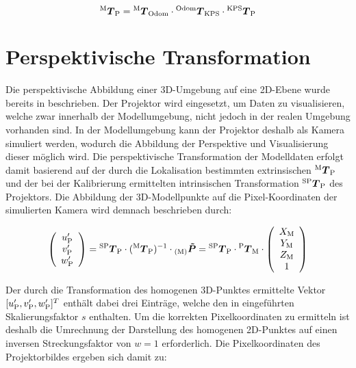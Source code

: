 \begin{equation}
{^{\mathrm{M}}\mbox{\boldmath{$T$}}_{\mathrm{P}}} = {^{\mathrm{M}}\mbox{\boldmath{$T$}}_{\mathrm{Odom}}} \cdot {^{\mathrm{Odom}}\mbox{\boldmath{$T$}}_{\mathrm{KPS}}} \cdot {^{\mathrm{KPS}}\mbox{\boldmath{$T$}}_{\mathrm{P}}}
\end{equation}

\section{Perspektivische Transformation}
Die perspektivische Abbildung einer 3D-Umgebung auf eine 2D-Ebene wurde bereits in  beschrieben. Der Projektor wird eingesetzt, um Daten zu visualisieren, welche zwar innerhalb der Modellumgebung, nicht jedoch in der realen Umgebung vorhanden sind. In der Modellumgebung kann der Projektor deshalb als Kamera simuliert werden, wodurch die Abbildung der Perspektive und Visualisierung dieser möglich wird. Die perspektivische Transformation der Modelldaten erfolgt damit basierend auf der durch die Lokalisation bestimmten extrinsischen ${^{\mathrm{M}}\mbox{\boldmath{$T$}}_{\mathrm{P}}}$ und der bei der Kalibrierung ermittelten intrinsischen Transformation ${^{\mathrm{SP}}\mbox{\boldmath{$T$}}_{\mathrm{P}}}$ des Projektors. Die Abbildung der 3D-Modellpunkte auf die Pixel-Koordinaten der simulierten Kamera wird demnach beschrieben durch:

\begin{equation}
\left(\begin{array}{c}
u_{{\mathrm{P}}}'\\
v_{{\mathrm{P}}}'\\
w_{{\mathrm{P}}}'
\end{array}\right)
= {^{\mathrm{SP}}\mbox{\boldmath{$T$}}_{\mathrm{P}}} \cdot ({^{\mathrm{M}}\mbox{\boldmath{$T$}}_{\mathrm{P}}})^{-1} \cdot {_{{\mathrm{(M)}}}}\mbox{\boldmath{$\tilde{P}$}} = {^{\mathrm{SP}}\mbox{\boldmath{$T$}}_{\mathrm{P}}} \cdot {^{\mathrm{P}}\mbox{\boldmath{$T$}}_{\mathrm{M}}} \cdot \left(\begin{array}{c}
X_{{\mathrm{M}}}\\
Y_{{\mathrm{M}}}\\
Z_{{\mathrm{M}}}\\
1
\end{array} \right)
\label{eq.proj_trans}
\end{equation}


Der durch die Transformation des homogenen 3D-Punktes ermittelte Vektor $[u_{{\mathrm{P}}}',v_{{\mathrm{P}}}',w_{{\mathrm{P}}}']^T$ enthält dabei drei Einträge, welche den in  eingeführten Skalierungsfaktor $s$ enthalten. Um die korrekten Pixelkoordinaten zu ermitteln ist deshalb die Umrechnung der Darstellung des homogenen 2D-Punktes auf einen inversen Streckungsfaktor von $w=1$ erforderlich. Die Pixelkoordinaten des Projektorbildes ergeben sich damit zu:

